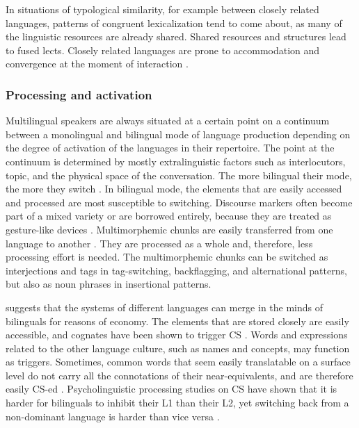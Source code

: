 \documentclass[output=paper,
modfonts
]{langscibook}
\begin{document}

In situations of typological similarity, for example between closely related languages, patterns of congruent lexicalization tend to come about, as many of the linguistic resources are already shared. Shared resources and structures lead to fused lects. Closely related languages are prone to accommodation and convergence at the moment of interaction \parencite{muysken2000,muysken2013language,clyne2003dynamics}.


\subsubsection*{Processing and activation}

Multilingual speakers are always situated at a certain point on a continuum between a monolingual and bilingual mode of language production depending on the degree of activation of the languages in their repertoire. The point at the continuum is determined by mostly extralinguistic factors such as interlocutors, topic, and the physical space of the conversation. The more bilingual their mode, the more they switch \parencite{grosjean1997processing}. In bilingual mode, the elements that are easily accessed and processed are most susceptible to switching. Discourse markers often become part of a mixed variety or are borrowed entirely, because they are treated as gesture-like devices \parencite[pp.193]{matras2009language}. Multimorphemic chunks are easily transferred from one language to another \cite{backus2003units}. They are processed as a whole and, therefore, less processing effort is needed. The multimorphemic chunks can be switched as interjections and tags in tag-switching, backflagging, and alternational patterns, but also as noun phrases in insertional patterns. 

\cite{matras2011explaining} suggests that the systems of different languages can merge in the minds of bilinguals for reasons of economy. The elements that are stored closely are easily accessible, and cognates have been shown to trigger CS \parencite{clyne1967transference}. Words and expressions related to the other language culture, such as names and concepts, may function as triggers. Sometimes, common words that seem easily translatable on a surface level do not carry all the connotations of their near-equivalents, and are therefore easily CS-ed \parencite{backus2001role} \parencite[pp.112]{matras2009language}. Psycholinguistic processing studies on CS have shown that it is harder for bilinguals to inhibit their L1 than their L2, yet switching back from a non-dominant language is harder than vice versa \parencite[pp. 141]{gardner2009code}. 
\end{document}

